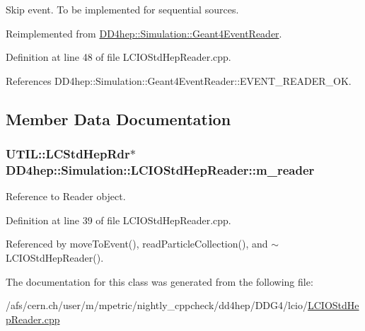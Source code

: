 Skip event. To be implemented for sequential sources. 

Reimplemented from \hyperlink{class_d_d4hep_1_1_simulation_1_1_geant4_event_reader_a9381626ad4f4fa20e304414f6654ee03}{DD4hep::Simulation::Geant4EventReader}.

Definition at line 48 of file LCIOStdHepReader.cpp.

References DD4hep::Simulation::Geant4EventReader::EVENT\_\-READER\_\-OK.

\subsection{Member Data Documentation}
\hypertarget{class_d_d4hep_1_1_simulation_1_1_l_c_i_o_std_hep_reader_a6545b15d1a2012ef556e97c33df91a98}{
\subsubsection[{m\_\-reader}]{\setlength{\rightskip}{0pt plus 5cm}UTIL::LCStdHepRdr$\ast$ {\bf DD4hep::Simulation::LCIOStdHepReader::m\_\-reader}}}
\label{class_d_d4hep_1_1_simulation_1_1_l_c_i_o_std_hep_reader_a6545b15d1a2012ef556e97c33df91a98}


Reference to Reader object. 

Definition at line 39 of file LCIOStdHepReader.cpp.

Referenced by moveToEvent(), readParticleCollection(), and $\sim$LCIOStdHepReader().

The documentation for this class was generated from the following file:\begin{DoxyCompactItemize}
\item 
/afs/cern.ch/user/m/mpetric/nightly\_\-cppcheck/dd4hep/DDG4/lcio/\hyperlink{_l_c_i_o_std_hep_reader_8cpp}{LCIOStdHepReader.cpp}\end{DoxyCompactItemize}
